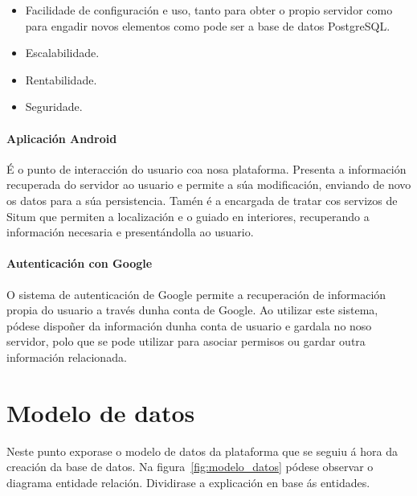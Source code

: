 \begin{itemize}
	\item Facilidade de configuración e uso, tanto para obter o propio servidor como para engadir novos elementos como pode ser a base de datos PostgreSQL.
	\item Escalabilidade.
	\item Rentabilidade.
	\item Seguridade.
\end{itemize}

\paragraph{Aplicación Android}
É o punto de interacción do usuario coa nosa plataforma. Presenta a información recuperada do servidor ao usuario e permite a súa modificación, enviando de novo os datos para a súa persistencia. Tamén é a encargada de tratar cos servizos de Situm que permiten a localización e o guiado en interiores, recuperando a información necesaria e presentándolla ao usuario.

\paragraph{Autenticación con Google}
O sistema de autenticación de Google permite a recuperación de información propia do usuario a través dunha conta de Google. Ao utilizar este sistema, pódese dispoñer da información dunha conta de usuario e gardala no noso servidor, polo que se pode utilizar para asociar permisos ou gardar outra información relacionada.


\section{Modelo de datos}
Neste punto exporase o modelo de datos da plataforma que se seguiu á hora da creación da base de datos. Na figura~\ref{fig:modelo_datos} pódese observar o diagrama entidade relación. Dividirase a explicación en base ás entidades.

